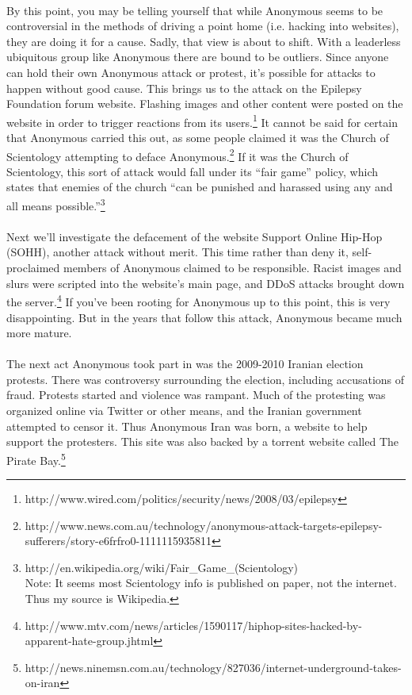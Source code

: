 \documentclass{article}
\begin{document}
\paragraph{}
By this point, you may be telling yourself that while Anonymous seems to be
controversial in the methods of driving a point home (i.e. hacking into websites),
they are doing it for a cause.  Sadly, that view is about to shift. With a 
leaderless ubiquitous group like Anonymous there are bound to be outliers. Since
anyone can hold their own Anonymous attack or protest, it's possible for attacks
to happen without good cause.  This brings us to the attack on the Epilepsy
Foundation forum website.  Flashing images and other content were posted on the
website in order to trigger reactions from its users.\footnote{
http://www.wired.com/politics/security/news/2008/03/epilepsy}
It cannot be said for certain that Anonymous carried this out, as some people
claimed it was the Church of Scientology attempting to deface Anonymous.\footnote{
http://www.news.com.au/technology/anonymous-attack-targets-epilepsy-sufferers/story-e6frfro0-1111115935811}
If it was the Church of Scientology, this sort of attack would fall under its
``fair game'' policy, which states that enemies of the church ``can be punished 
and harassed using any and all means possible.''\footnote{
http://en.wikipedia.org/wiki/Fair\_Game\_(Scientology)\\
Note: It seems most Scientology info is published on paper, not the internet.
Thus my source is Wikipedia.}

\paragraph{}
Next we'll investigate the defacement of the website Support Online Hip-Hop
(SOHH), another attack without merit.  This time rather than deny it, 
self-proclaimed members of Anonymous claimed to be responsible.  Racist images
and slurs were scripted into the website's main page, and DDoS attacks brought
down the server.\footnote{
http://www.mtv.com/news/articles/1590117/hiphop-sites-hacked-by-apparent-hate-group.jhtml}
If you've been rooting for Anonymous up to this point, this is very
disappointing.  But in the years that follow this attack, Anonymous became
much more mature.

\paragraph{}
The next act Anonymous took part in was the 2009-2010 Iranian election protests.
There was controversy surrounding the election, including accusations of fraud.
Protests started and violence was rampant.  Much of the protesting was organized
online via Twitter or other means, and the Iranian government attempted to censor
it.  Thus Anonymous Iran was born, a website to help support the protesters.
This site was also backed by a torrent website called The Pirate Bay.\footnote{
http://news.ninemsn.com.au/technology/827036/internet-underground-takes-on-iran}
\end{document}
